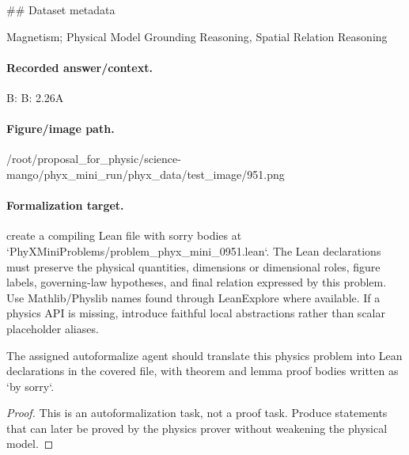 \#\# Dataset metadata

Magnetism; Physical Model Grounding Reasoning, Spatial Relation Reasoning

\paragraph{Recorded answer/context.}
B: B: 2.26A

\paragraph{Figure/image path.}
/root/proposal\_for\_physic/science-mango/phyx\_mini\_run/phyx\_data/test\_image/951.png

\paragraph{Formalization target.}
create a compiling Lean file with sorry bodies at `PhyXMiniProblems/problem\_phyx\_mini\_0951.lean`. The Lean declarations must preserve the physical quantities, dimensions or dimensional roles, figure labels, governing-law hypotheses, and final relation expressed by this problem.
Use Mathlib/Physlib names found through LeanExplore where available. If a physics API is missing, introduce faithful local abstractions rather than scalar placeholder aliases.

\begin{theorem}
\label{thm:physics:phyx_mini_0951:target}
The assigned autoformalize agent should translate this physics problem into Lean declarations in the covered file, with theorem and lemma proof bodies written as `by sorry`.
\end{theorem}
\begin{proof}
This is an autoformalization task, not a proof task. Produce statements that can later be proved by the physics prover without weakening the physical model.
\end{proof}


